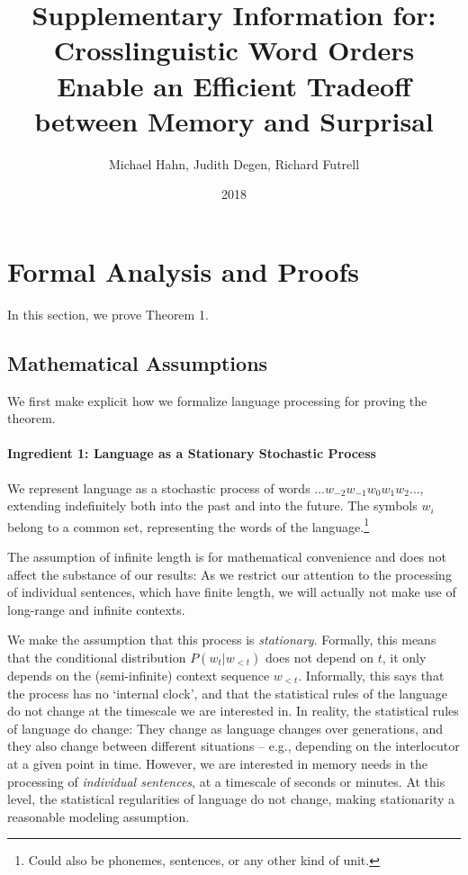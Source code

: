 \documentclass[11pt,letterpaper]{article}
\title{Supplementary Information for: Crosslinguistic Word Orders Enable an Efficient Tradeoff between Memory and Surprisal}
\author{Michael Hahn, Judith Degen, Richard Futrell}
\date{2018}
\newcounter{theorem}
\begin{document}
\maketitle

\tableofcontents


%
%
%


\section{Formal Analysis and Proofs}

In this section, we prove Theorem 1.

\subsection{Mathematical Assumptions}

We first make explicit how we formalize language processing for proving the theorem.


\paragraph{Ingredient 1: Language as a Stationary Stochastic Process}
We represent language as a stochastic process of words $\dots w_{-2} w_{-1} w_0 w_{1} w_{2} \dots$, extending indefinitely both into the past and into the future.
The symbols $w_i$ belong to a common set, representing the words of the language.\footnote{Could also be phonemes, sentences, or any other kind of unit.}

The assumption of infinite length is for mathematical convenience and does not affect the substance of our results:
As we restrict our attention to the processing of individual sentences, which have finite length, we will actually not make use of long-range and infinite contexts.

We make the assumption that this process is \emph{stationary}.
Formally, this means that the conditional distribution $P(w_t|w_{<t})$ does not depend on $t$, it only depends on the (semi-infinite) context sequence $w_{<t}$.
Informally, this says that the process has no `internal clock', and that the statistical rules of the language do not change at the timescale we are interested in.
In reality, the statistical rules of language do change: They change as language changes over generations, and they also change between different situations -- e.g., depending on the interlocutor at a given point in time.
However, we are interested in memory needs in the processing of \emph{individual sentences}, at a timescale of seconds or minutes.
At this level, the statistical regularities of language do not change, making stationarity a reasonable modeling assumption.
\end{document}
